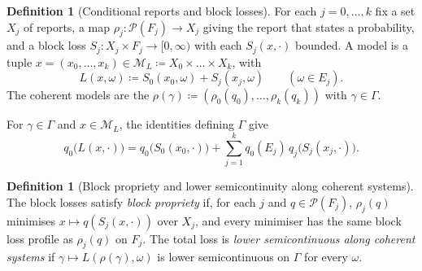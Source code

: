 \documentclass[11pt]{article}
\theoremstyle{definition}
\newtheorem{definition}[theorem]{Definition}
\theoremstyle{remark}
\newcommand{\M}{\mathcal M}
\newcommand{\PP}{\mathcal P}
\begin{document}
\begin{definition}[Conditional reports and block losses]\label{def:block-reports}
For each $j=0,\dots,k$ fix a set $X_j$ of reports, a map $\rho_j:\PP(F_j)\to X_j$ giving the report that states a probability, and a block loss $S_j:X_j\times F_j\to[0,\infty)$ with each $S_j(x,\cdot)$ bounded. A model is a tuple $x=(x_0,\dots,x_k)\in\M_L\coloneqq X_0\times\dots\times X_k$, with
\[
L(x,\omega)\coloneqq S_0(x_0,\omega)+S_j(x_j,\omega)\qquad(\omega\in E_j).
\]
The coherent models are the $\rho(\gamma)\coloneqq(\rho_0(q_0),\dots,\rho_k(q_k))$ with $\gamma\in\Gamma$.
\end{definition}

For $\gamma\in\Gamma$ and $x\in\M_L$, the identities defining $\Gamma$ give
\begin{equation}\label{eq:blocks}
q_0\bigl(L(x,\cdot)\bigr)=q_0\bigl(S_0(x_0,\cdot)\bigr)+\sum_{j=1}^kq_0(E_j)\,q_j\bigl(S_j(x_j,\cdot)\bigr).
\end{equation}

\begin{definition}[Block propriety and lower semicontinuity along coherent systems]\label{def:block-propriety}
The block losses satisfy \emph{block propriety} if, for each $j$ and
$q\in\PP(F_j)$, $\rho_j(q)$ minimises $x\mapsto q(S_j(x,\cdot))$ over $X_j$,
and every minimiser has the same block loss profile as $\rho_j(q)$ on $F_j$.
The total loss is \emph{lower semicontinuous along coherent systems} if
$\gamma\mapsto L(\rho(\gamma),\omega)$ is lower semicontinuous on $\Gamma$ for every $\omega$.
\end{definition}
\end{document}
